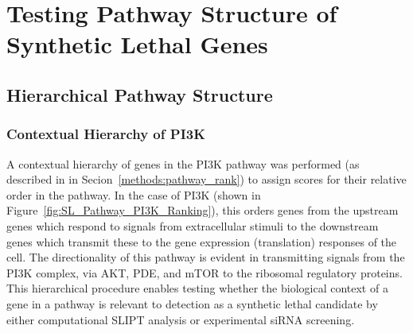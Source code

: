\begin{table*}[!htb]
\caption{ANOVA for Synthetic Lethality and PageRank Centrality}
\label{tab:SL_Pathway_PI3K_PageRank}
\noindent{}
\end{table*}

\FloatBarrier

\section{Testing Pathway Structure of Synthetic Lethal Genes}

\FloatBarrier

\subsection{Hierarchical Pathway Structure}

\subsubsection{Contextual Hierarchy of PI3K}  \label{chapt4:Network_Hierachy}

\FloatBarrier

A contextual hierarchy of genes in the PI3K pathway was performed (as described in in Secion~\ref{methods:pathway_rank}) to assign scores for their relative order in the pathway. In the case of PI3K (shown in Figure~\ref{fig:SL_Pathway_PI3K_Ranking}), this orders genes from the upstream genes which respond to signals from extracellular stimuli to the downstream genes which transmit these to the gene expression (translation) responses of the cell. The directionality of this pathway is evident in transmitting signals from the \gls{PI3K} complex, via AKT, \gls{PDE}, and mTOR to the ribosomal regulatory proteins. This hierarchical procedure enables testing whether the biological context of a gene in a pathway is relevant to detection as a synthetic lethal candidate by either computational \gls{SLIPT} analysis or experimental \gls{siRNA} screening.


